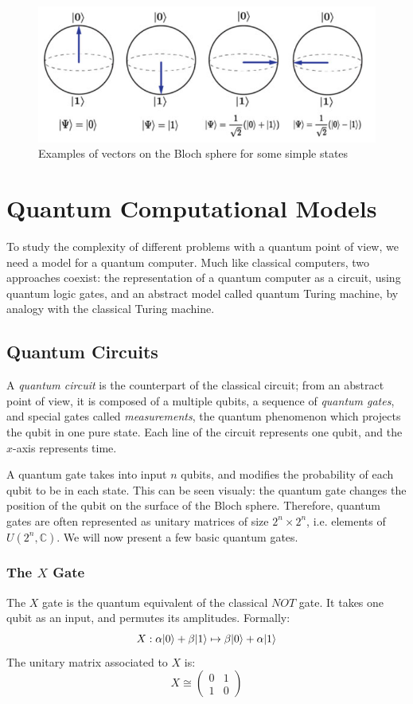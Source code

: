 \documentclass[12pt,a4paper]{article}
\theoremstyle{definition}
\DeclarePairedDelimiter\ket{\lvert}{\rangle}
\begin{document}
\begin{figure}[!h]
    \centering
    \includegraphics*[scale=0.5]{bloch-examples.png}
    \caption{Examples of vectors on the Bloch sphere for some simple states}
\end{figure}

\section{Quantum Computational Models}
To study the complexity of different problems with a quantum point of view, we need a model for a quantum computer. Much like classical computers, two approaches coexist: the representation of a quantum computer as a circuit, using quantum logic gates, and an abstract model called quantum Turing machine, by analogy with the classical Turing machine.

\subsection{Quantum Circuits}
A \emph{quantum circuit} is the counterpart of the classical circuit; from an abstract point of view, it is composed of a multiple qubits, a sequence of \emph{quantum gates}, and special gates called \emph{measurements}, the quantum phenomenon which projects the qubit in one pure state. Each line of the circuit represents one qubit, and the $x$-axis represents time. 

A quantum gate takes into input $n$ qubits, and modifies the probability of each qubit to be in each state. This can be seen visualy: the quantum gate changes the position of the qubit on the surface of the Bloch sphere. Therefore, quantum gates are often represented as unitary matrices of size $2^n \times 2^n$, i.e. elements of $U(2^n, \mathbb{C})$. We will now present a few basic quantum gates.

\subsubsection{The \texorpdfstring{$X$}{X} Gate}
The $X$ gate is the quantum equivalent of the classical $NOT$ gate. It takes one qubit as an input, and permutes its amplitudes. Formally:
\begin{equation*}
    X : \alpha\ket{0} + \beta\ket{1} \mapsto \beta\ket{0} + \alpha\ket{1}
\end{equation*}
The unitary matrix associated to $X$ is:
\begin{equation*}
    X \cong \begin{pmatrix}
        0&1\\
        1&0
    \end{pmatrix}
\end{equation*}
\end{document}

